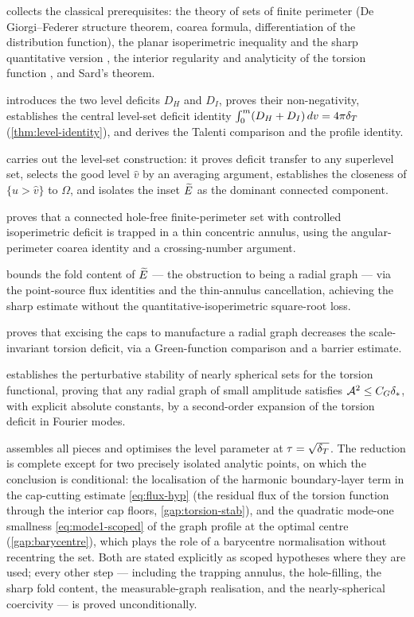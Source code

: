  collects the classical prerequisites: the theory of
sets of finite perimeter (De Giorgi--Federer structure theorem, coarea
formula, differentiation of the distribution function), the planar
isoperimetric inequality and the sharp quantitative version
\cite{FMP2008}, the interior regularity and analyticity of the torsion
function \cite{GilbargTrudinger2001}, and Sard's theorem.

 introduces the two level deficits $D_H$ and $D_I$,
proves their non-negativity, establishes the central level-set deficit
identity $\int_0^m(D_H+D_I)\,d v=4\pi\delta_T$ (\cref{thm:level-identity}),
and derives the Talenti comparison and the profile identity.

 carries out the level-set construction: it proves
deficit transfer to any superlevel set, selects the good level $\hat v$
by an averaging argument, establishes the closeness of $\{u>\hat v\}$
to $\Omega$, and isolates the inset $\widetilde{E}$ as the dominant connected
component.

 proves that a connected hole-free finite-perimeter
set with controlled isoperimetric deficit is trapped in a thin
concentric annulus, using the angular-perimeter coarea identity and a
crossing-number argument.

 bounds the fold content of $\widetilde{E}$ --- the obstruction
to being a radial graph --- via the point-source flux identities and the
thin-annulus cancellation, achieving the sharp estimate without the
quantitative-isoperimetric square-root loss.

 proves that excising the caps to manufacture a radial
graph decreases the scale-invariant torsion deficit, via a
Green-function comparison and a barrier estimate.

 establishes the perturbative stability of nearly
spherical sets for the torsion functional, proving that any radial graph
of small amplitude satisfies $\mathcal{A}^2\le C_G\delta_{*}$, with explicit
absolute constants, by a second-order expansion of the torsion deficit
in Fourier modes.

 assembles all pieces and optimises the level parameter at
$\tau=\sqrt{\delta_T}$. The reduction is complete except for two precisely isolated
analytic points, on which the conclusion is conditional: the localisation of
the harmonic boundary-layer term in the cap-cutting estimate
\eqref{eq:flux-hyp} (the residual flux of the torsion function through the
interior cap floors, \cref{gap:torsion-stab}), and the quadratic mode-one
smallness \eqref{eq:mode1-scoped} of the graph profile at the optimal centre
(\cref{gap:barycentre}), which plays the role of a barycentre normalisation
without recentring the set. Both are stated explicitly as scoped hypotheses
where they are used; every other step --- including the trapping annulus, the
hole-filling, the sharp fold content, the measurable-graph realisation, and
the nearly-spherical coercivity --- is proved unconditionally.

